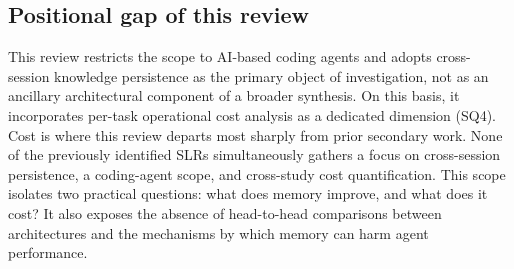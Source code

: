 \subsection{Positional gap of this review}
\label{sec:rel-lacuna}

This review restricts the scope to AI-based coding agents and adopts
cross-session knowledge persistence as the primary object of
investigation, not as an ancillary architectural component of a broader
synthesis.
On this basis, it incorporates per-task operational cost analysis as a
dedicated dimension (SQ4).
Cost is where this review departs most sharply from prior secondary
work.
None of the previously identified SLRs simultaneously gathers a focus
on cross-session persistence, a coding-agent scope, and cross-study cost
quantification.
This scope isolates two practical questions:
what does memory improve, and what does it cost?
It also exposes the absence of head-to-head comparisons between
architectures and the mechanisms by which memory can harm agent
performance.

